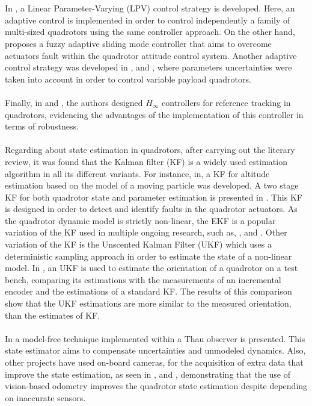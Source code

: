 \\\\
In \cite{Ameho2013}, a Linear Parameter-Varying (LPV) control strategy is developed. Here, an adaptive control is implemented in order to control independently a family of multi-sized quadrotors using the same controller approach. On the other hand, \cite{Gao2015} proposes a fuzzy adaptive sliding mode
controller that aims to overcome actuators fault within the quadrotor attitude control system. Another adaptive control strategy was developed in \cite{Wang2017a}, \cite{Emran2015} and \cite{Wang2017}, where parameters uncertainties were taken into account in order to control variable payload quadrotors.
\\\\
Finally, in \cite{Prayitno2016} and \cite{Ortiz2016}, the authors designed $H_{\infty}$ controllers for reference tracking in quadrotors, evidencing the advantages of the implementation of this controller in terms of robustness.
\\\\
Regarding about state estimation in quadrotors, after carrying out the literary review, it was found that the Kalman filter (KF) is a widely used estimation algorithm in all its different variants. For instance, in\cite{Munoz2017}, a KF for altitude estimation based on the model of a moving particle was developed. A two stage KF for both quadrotor state and parameter estimation is presented in \cite{Moghadam2015}. This KF is designed in order to detect and identify faults in the quadrotor actuators. As the quadrotor dynamic model is strictly non-linear, the EKF is a popular variation of the KF used in multiple ongoing research, such as\cite{Goodarzi2016}, \cite{Oh2015}, and \cite{Sebesta2014}. Other variation of the KF is the Unscented Kalman Filter (UKF) which uses a deterministic sampling approach in order to estimate the state of a non-linear model. In \cite{Goslinski2013}, an UKF is used to estimate the orientation of a quadrotor on a test bench, comparing its estimations with the measurements of an incremental encoder and the estimations of a standard KF. The results of this comparison show that the UKF estimations are more similar to the measured orientation, than the estimates of KF.
\\\\
In \cite{AlYounes2015} a model-free technique implemented within a Thau observer is presented. This state estimator aims to compensate uncertainties and unmodeled dynamics. Also, other projects have used on-board cameras, for the acquisition of extra data that improve the state estimation, as seen in \cite{Xie2016}, \cite{Yu2017} and \cite{Liu2017}, demonstrating that the use of vision-based odometry improves the quadrotor state estimation despite depending on inaccurate sensors.


